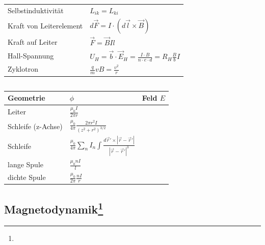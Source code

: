 \documentclass[12pt,a4paper]{article}
\newcommand{\abs}[1]{\left| #1 \right|}
\renewcommand{\=}[1]{\stackrel{#1}{=}}
\theoremstyle{definition}
\theoremstyle{remark}
\begin{document}
\begin{center}
\begin{minipage}[t]{.5\linewidth}
\begin{tabular}{ll}
Selbstinduktivität & $L_{ik} = L_{ki}$\\
Kraft von Leiterelement & $d\vec{F} = I \cdot (d\vec{l} \times \vec{B})$\\
Kraft auf Leiter & $\vec F = \vec B I l$\\
Hall-Spannung & $U_H = \vec{b} \cdot \vec{E}_H = \frac{I \cdot B}{n \cdot e \cdot d} = R_H \frac{B}{b} I$\\
Zyklotron & $\frac{q}{m} v B = \frac{v^2}{r}$\\
\end{tabular}
\end{minipage}%
\begin{minipage}[t]{.5\linewidth}
\vspace{0pt}
\begin{tabular}{ll}

\end{tabular}
\end{minipage}
\end{center}

\begin{tabular}{lll}
\toprule
Geometrie & $\phi$ & Feld $E$\\
\midrule
Leiter & $\frac{\mu_0 I}{2\pi r}$\\
Schleife (z-Achse) & $\frac{\mu_0}{4\pi}\frac{2\pi r^2 I}{(z^2 + r^2)^{3/2}}$\\
Schleife & $\frac{\mu_0}{4\pi} \sum_n I_n \int \frac{d\vec r' \times \abs{\vec r - \vec r'}}{\abs{\vec r- \vec r'}^3}$\\
lange Spule & $\frac{\mu_0 n I}{l}$\\
dichte Spule & $\frac{\mu_0}{2\pi}\frac{n I}{r}$\\
\bottomrule
\end{tabular}


\subsection[Magnetodynamik]{Magnetodynamik\let\thefootnote\relax\footnote{}}
\end{document}
